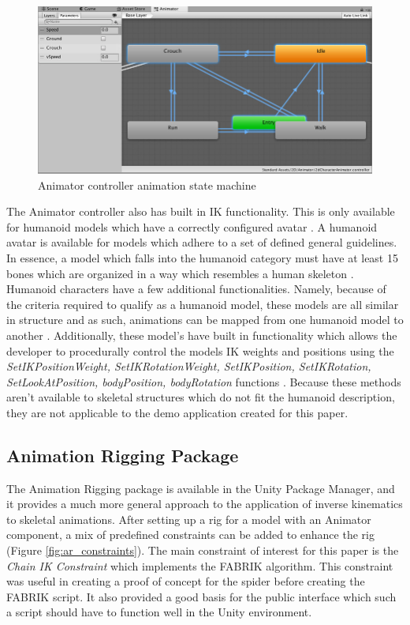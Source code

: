 \begin{figure}
    \centering
    \includegraphics[width=\textwidth]{grafika/animator_controller.png}
    \caption{Animator controller animation state machine \cite{unity_animator}}
    \label{fig:anim_state}
\end{figure}

The Animator controller also has built in IK functionality. This is only
available for humanoid models which have a correctly configured avatar
\cite{unity_ik}. A humanoid avatar is available for models which adhere to a set
of defined general guidelines. In essence, a model which falls into the humanoid
category must have at least 15 bones which are organized in a way which
resembles a human skeleton \cite{unity_humanoid_import}. Humanoid characters
have a few additional functionalities. Namely, because of the criteria required
to qualify as a humanoid model, these models are all similar in structure and as
such, animations can be mapped from one humanoid model to another
\cite{unity_humanoid_avatars}. Additionally, these model's have built in
functionality which allows the developer to procedurally control the models IK
weights and positions using the \textit{SetIKPositionWeight,
SetIKRotationWeight, SetIKPosition, SetIKRotation, SetLookAtPosition,
bodyPosition, bodyRotation} functions \cite{unity_ik, unity_humanoid_avatars}.
Because these methods aren't available to skeletal structures which do not fit
the humanoid description, they are not applicable to the demo application
created for this paper.

\subsection{Animation Rigging Package}

The Animation Rigging package is available in the Unity Package Manager, and it
provides a much more general approach to the application of inverse kinematics
to skeletal animations. After setting up a rig for a model with an Animator
component, a mix of predefined constraints can be added to enhance the rig
(Figure \ref{fig:ar_constraints}). The main constraint of interest for this
paper is the \textit{Chain IK Constraint} which implements the FABRIK algorithm.
This constraint was useful in creating a proof of concept for the spider before
creating the FABRIK script. It also provided a good basis for the public
interface which such a script should have to function well in the Unity
environment.

